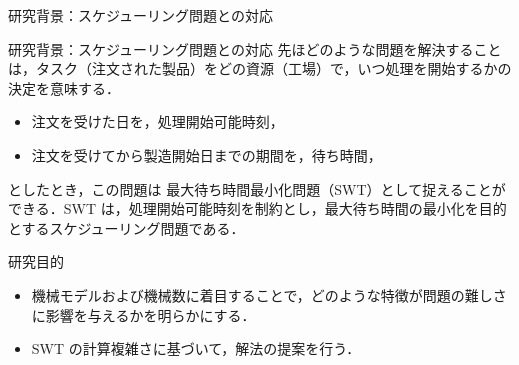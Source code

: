\documentclass[dvipdfmx]{beamer}
\begin{document}
    \begin{frame}{研究背景：スケジューリング問題との対応}
      \begin{block}{研究背景：スケジューリング問題との対応}
        先ほどのような問題を解決することは，\alert{タスク}（注文された製品）をどの\alert{資源}（工場）で，\alert{いつ}処理を開始するかの決定を意味する．
        \begin{itemize}
          \item 注文を受けた日を，\alert{処理開始可能時刻}，
          \item 注文を受けてから製造開始日までの期間を，\alert{待ち時間}，
        \end{itemize}
        としたとき，この問題は \alert{最大待ち時間最小化問題（SWT）}として捉えることができる．SWT は，処理開始可能時刻を制約とし，最大待ち時間の最小化を目的とするスケジューリング問題である．
      \end{block}

      \begin{block}{研究目的}
        \begin{itemize}
          \item 機械モデルおよび機械数に着目することで，どのような特徴が問題の難しさに影響を与えるかを明らかにする．
          \item SWT の計算複雑さに基づいて，解法の提案を行う．
        \end{itemize}
      \end{block}

    \end{frame}
\end{document}
